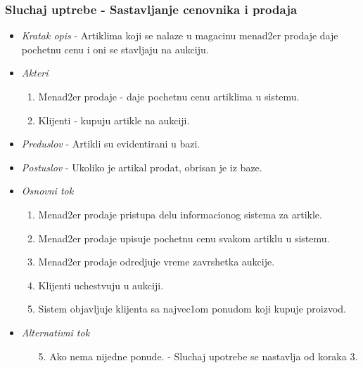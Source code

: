 \documentclass[10 pt]{article}
\begin{document}
	\subsubsection{Sluchaj uptrebe - Sastavljanje cenovnika i prodaja}
	
		\begin{itemize}
			\item\textit{Kratak opis} - Artiklima koji se nalaze u magacinu menad2er prodaje daje pochetnu cenu i oni se stavljaju na aukciju. 
			
			\item\textit{Akteri}
				\begin{enumerate}
					\item Menad2er prodaje - daje pochetnu cenu artiklima u sistemu.
					\item Klijenti - kupuju artikle na aukciji.
				\end{enumerate}

			
			\item\textit{Preduslov} - Artikli su evidentirani u bazi. 
			
			\item\textit{Postuslov} - Ukoliko je artikal prodat, obrisan je iz baze.

			
			\item\textit{Osnovni tok}
			\begin{enumerate}
				\item Menad2er prodaje pristupa delu informacionog sistema za artikle.
				\item Menad2er prodaje upisuje pochetnu cenu svakom artiklu u sistemu.

				\item Menad2er prodaje odredjuje vreme zavrshetka aukcije.

				\item Klijenti uchestvuju u aukciji.

				\item Sistem objavljuje klijenta sa najvec1om ponudom koji kupuje proizvod.
			\end{enumerate} 

			
			\item\textit{Alternativni tok}
			\begin{enumerate}
				\item [5.] Ako nema nijedne ponude. - Sluchaj upotrebe se nastavlja od koraka 3.
			\end{enumerate}
			
		\end{itemize}
	
	
	
\end{document}
